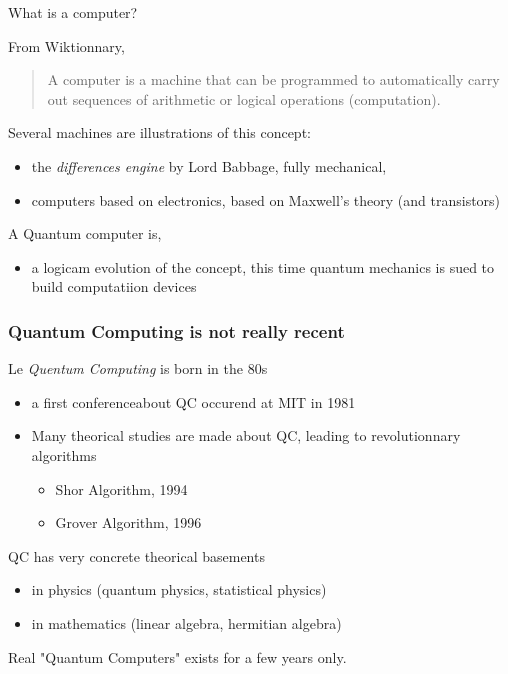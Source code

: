 \begin{frame}{What is a computer?}
From Wiktionnary, \begin{quotation}
   A computer is a machine that can be programmed to automatically carry out sequences of arithmetic or logical operations (computation). 
\end{quotation}
Several machines are illustrations of this concept:
\begin{itemize}
    \item the \textit{differences engine} by Lord Babbage, fully mechanical,
    \item computers based on electronics, based on Maxwell's theory (and transistors)
\end{itemize}
A Quantum computer is,
\begin{itemize}
    \item a logicam evolution of the concept, this time quantum mechanics is sued to build computatiion devices
\end{itemize}

\end{frame}

\begin{frame}[plain]
\frametitle{Quantum Computing is not really recent}
Le \textit{Quentum Computing} is born in the 80s
\begin{itemize}
   \item a first conferenceabout QC occurend at MIT in 1981
   \item Many theorical studies are made about QC, leading to revolutionnary algorithms
   \begin{itemize}
       \item Shor Algorithm, 1994
       \item Grover Algorithm, 1996
   \end{itemize}
\end{itemize}

QC has very concrete theorical basements
\begin{itemize}
    \item in physics (quantum physics, statistical physics)
    \item in mathematics (linear algebra, hermitian algebra)
\end{itemize}


Real "Quantum Computers" exists for a few years only. 

\end{frame}

